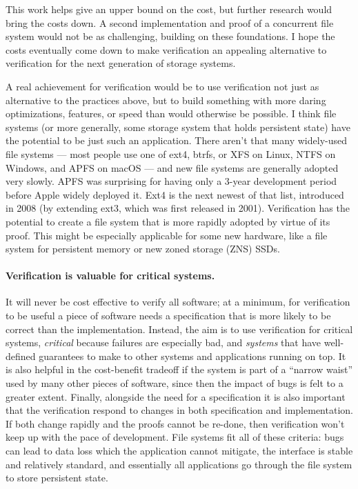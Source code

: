 This work helps give an upper bound on the cost, but further research would
bring the costs down. A second implementation and proof of a concurrent file
system would not be as challenging, building on these foundations. I hope the
costs eventually come down to make verification an appealing alternative to
verification for the next generation of storage systems.

A real achievement for verification would be to use verification not just as
alternative to the practices above, but to build something with more daring optimizations,
features, or speed than would otherwise be possible. I think file systems (or
more generally, some storage system that holds persistent state) have the
potential to be just such an application. There aren't that many widely-used
file systems --- most people use one of ext4, btrfs, or XFS on Linux, NTFS on
Windows, and APFS on macOS --- and new file systems are generally adopted very
slowly. APFS was surprising for having only a 3-year development period before
Apple widely deployed it. Ext4 is the next newest of that list, introduced in
2008 (by extending ext3, which was first released in 2001). Verification has the
potential to create a file system that is more rapidly adopted by virtue of its
proof. This might be especially applicable for some new hardware, like a file
system for persistent memory or new zoned storage (ZNS) SSDs.


\paragraph{Verification is valuable for critical systems.} It will never be cost
effective to verify all software; at a minimum, for verification to be useful a
piece of software needs a specification that is more likely to be correct than
the implementation.
Instead, the aim is to use verification for critical systems, \emph{critical}
because failures are especially bad, and \emph{systems} that have well-defined
guarantees to make to other systems and applications running on top. It is also
helpful in the cost-benefit tradeoff if the system is part of a ``narrow waist''
used by many other pieces of software, since then the impact of bugs is felt to
a greater extent. Finally, alongside the need for a specification it is also
important that the verification respond to changes in both specification and
implementation. If both change rapidly and the proofs cannot be re-done, then
verification won't keep up with the pace of development. File systems fit all of
these criteria: bugs can lead to data loss which the application cannot
mitigate, the interface is stable and relatively standard, and essentially all
applications go through the file system to store persistent state.

